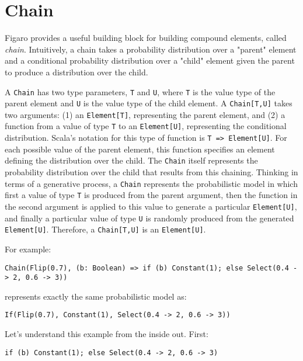 \section{Chain}

Figaro provides a useful building block for building compound elements, called \emph{chain}. Intuitively, a chain takes a probability distribution over a "parent" element and a conditional probability distribution over a "child" element given the parent to produce a distribution over the child.

A \texttt{Chain} has two type parameters, \texttt{T} and \texttt{U}, where \texttt{T} is the value type of the parent element and \texttt{U} is the value type of the child element. A \texttt{Chain[T,U]} takes two arguments: (1) an \texttt{Element[T]}, representing the parent element, and (2) a function from a value of type \texttt{T} to an \texttt{Element[U]}, representing the conditional distribution. Scala's notation for this type of function is \texttt{T => Element[U]}. For each possible value of the parent element, this function specifies an element defining the distribution over the child. The \texttt{Chain} itself represents the probability distribution over the child that results from this chaining. Thinking in terms of a generative process, a \texttt{Chain} represents the probabilistic
model in which first a value of type \texttt{T} is produced from the parent argument, then the function in the second argument is applied to this value to generate a particular \texttt{Element[U]}, and finally a particular value of type \texttt{U} is randomly produced from the generated \texttt{Element[U]}. Therefore, a \texttt{Chain[T,U]} is an \texttt{Element[U]}.

For example:
\begin{flushleft}
\texttt{Chain(Flip(0.7), (b: Boolean) =>
\newline \tab if (b) Constant(1); else Select(0.4 -> 2, 0.6 -> 3))}
\end{flushleft}

represents exactly the same probabilistic model as:

\begin{flushleft}
\texttt{If(Flip(0.7), Constant(1), Select(0.4 -> 2, 0.6 -> 3))}
\end{flushleft}

Let's understand this example from the inside out. First:

\begin{flushleft}
\texttt{if (b) Constant(1); else Select(0.4 -> 2, 0.6 -> 3)}
\end{flushleft}

